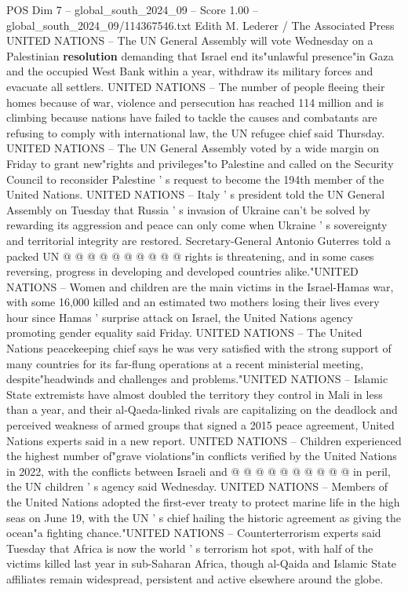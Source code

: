 \begin{textsample}{POS Dim 7 – global\_south\_2024\_09 – Score 1.00 – global\_south\_2024\_09/114367546.txt}  \label{ex:f7_pos_278}
Edith M.
Lederer / The Associated Press UNITED NATIONS -- The UN General Assembly will vote Wednesday on a Palestinian \textbf{resolution} demanding that Israel end its"unlawful presence"in Gaza and the occupied West Bank within a year, withdraw its military forces and evacuate all settlers.
UNITED NATIONS -- The number of people fleeing their homes because of war, violence and persecution has reached 114 million and is climbing because nations have failed to tackle the causes and combatants are refusing to comply with international law, the UN refugee chief said Thursday.
UNITED NATIONS -- The UN General Assembly voted by a wide margin on Friday to grant new"rights and privileges"to Palestine and called on the Security Council to reconsider Palestine ' s request to become the 194th member of the United Nations.
UNITED NATIONS -- Italy ' s president told the UN General Assembly on Tuesday that Russia ' s invasion of Ukraine can't be solved by rewarding its aggression and peace can only come when Ukraine ' s sovereignty and territorial integrity are restored.
Secretary-General Antonio Guterres told a packed UN @ @ @ @ @ @ @ @ @ @ rights is threatening, and in some cases reversing, progress in developing and developed countries alike."UNITED NATIONS -- Women and children are the main victims in the Israel-Hamas war, with some 16,000 killed and an estimated two mothers losing their lives every hour since Hamas ' surprise attack on Israel, the United Nations agency promoting gender equality said Friday.
UNITED NATIONS -- The United Nations peacekeeping chief says he was very satisfied with the strong support of many countries for its far-flung operations at a recent ministerial meeting, despite"headwinds and challenges and problems."UNITED NATIONS -- Islamic State extremists have almost doubled the territory they control in Mali in less than a year, and their al-Qaeda-linked rivals are capitalizing on the deadlock and perceived weakness of armed groups that signed a 2015 peace agreement, United Nations experts said in a new report.
UNITED NATIONS -- Children experienced the highest number of"grave violations"in conflicts verified by the United Nations in 2022, with the conflicts between Israeli and @ @ @ @ @ @ @ @ @ @ in peril, the UN children ' s agency said Wednesday.
UNITED NATIONS -- Members of the United Nations adopted the first-ever treaty to protect marine life in the high seas on June 19, with the UN ' s chief hailing the historic agreement as giving the ocean"a fighting chance."UNITED NATIONS -- Counterterrorism experts said Tuesday that Africa is now the world ' s terrorism hot spot, with half of the victims killed last year in sub-Saharan Africa, though al-Qaida and Islamic State affiliates remain widespread, persistent and active elsewhere around the globe.

\end{textsample}
